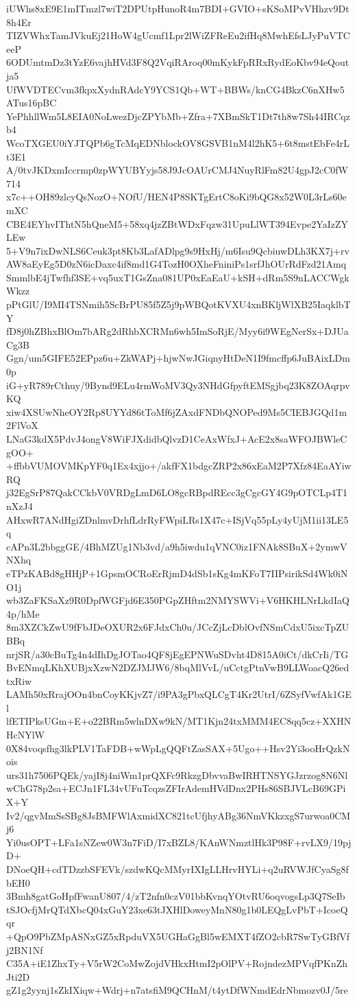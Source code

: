 iUWhs8xE9E1mITmzl7wiT2DPUtpHunoR4m7BDI+GVIO+sKSoMPvVHhzv9Dt8h4Er
TIZVWhxTamJVkuEj21HoW4gUcmf1Lpr2lWiZFReEu2ifHq8MwhEfsLJyPuVTCeeP
6ODUmtmDz3tYzE6vajhHVd3F8Q2VqiRAroq00mKykFpRRxRydEoKbv94eQoutja5
UfWVDTECvm3fkpxXydnRAdcY9YCS1Qb+WT+BBWs/knCG4BkzC6nXHw5ATus16pBC
YePhhllWm5L8EIA0NoLwezDjcZPYbMb+Zfra+7XBmSkT1Dt7th8w7Sh44IRCqzb4
WcoTXGEU0iYJTQPb6gTcMqEDNblockOV8GSVB1nM4l2hK5+6t8mstEbFe4rLt3E1
A/0tvJKDxmIccrmp0zpWYUBYyjs58J9JcOAUrCMJ4NuyRlFm82U4gpJ2cC0fW714
x7c++OH89zlcyQsNozO+NOfU/HEN4P8SKTgErtC8oKi9bQG8x52W0L3rLs60emXC
CBE4EYhvIThtN5hQneM5+58xq4jzZBtWDxFqzw31UpuLlWT394Evpe2YaIzZYLEw
5+V9n7ixDwNLS6Ceuk3pt8Kb3LafADlpg9s9HxHj/m6Isu9QcbiuwDLh3KX7j+rv
AW8aEyEg5D0zN6icDaxc4if8md1G4TozH0OXheFniniPs1srfJhOUrRdFzd21Amq
SmmlbE4jTwfhf3SE+vq5uxT1GsZna081UP0xEaEaU+kSH+dRm5S9nLACCWgkWkzz
pPtGlU/I9MI4TSNmih5ScBrPU85f5Z5j9pWBQotKVXU4xnBKljWlXB25IaqklbTY
fD8j0hZBhxBlOm7bARg2dRhbXCRMn6wh5ImSoRjE/Myy6i9WEgNerSx+DJUaCg3B
Ggn/um5GIFE52EPpz6u+ZkWAPj+hjwNwJGiqnyHtDeN1I9fmcffp6JuBAixLDm0p
iG+yR789rCthuy/9Bynd9ELu4rmWoMV3Qy3NHdGfpyftEMSgjbq23K8ZOAqrpvKQ
xiw4XSUwNheOY2Rp8UYYd86tToMf6jZAxdFNDbQNOPed9Ms5CIEBJGQd1m2FlVoX
LNaG3kdX5PdvJ4ongV8WiFJXdidbQlvzD1CeAxWfxJ+AcE2x8saWFOJBWleCgOO+
+ffbbVUMOVMKpYF0q1Ex4xjjo+/akfFX1bdgcZRP2x86xEaM2P7Xfz84EaAYiwRQ
j32EgSrP87QakCCkbV0VRDgLmD6LO8gcRBpdREcc3gCgcGY4G9pOTCLp4T1nXzJ4
AHxwR7ANdHgiZDnlmvDrhfLdrRyFWpiLRs1X47c+ISjVq55pLy4yUjM1ii13LE5q
cAPn3L2bbggGE/4BhMZUg1Nb3vd/a9h5iwdu1qVNC0iz1FNAk8SBuX+2ymwVNXhq
eTPzKABd8gHHjP+1GpsmOCRoErRjmD4dSb1sKg4mKFoT7IIPsirikSd4Wk0iNO1j
wb3ZaFKSaXz9R0DpfWGFjd6E350PGpZHftm2NMYSWVi+V6HKHLNrLkdIaQ4p/hMe
8m3XZCkZwU9fFbJDeOXUR2x6FJdxCh0u/JCcZjLcDblOvfNSmCdxU5ixcTpZUBBq
nrjSR/a30cBuTg4n4dIhDgJOTao4QF8jEgEPNWuSDvht4D815A0iCt/dkCrIi/TG
BvENmqLKhXUBjxXzwN2DZJMJW6/8bqMlVvL/uCctgPtnVwB9LLWoacQ26edtxRiw
LAMh50xRrajOOn4bnCoyKKjvZ7/i9PA3gPbxQLCgT4Kr2UtrI/6ZSyfVwfAk1GEl
lfETIPksUGm+E+o22BRm5wlnDXw9kN/MT1Kjn24txMMM4EC8qq5cz+XXHNHcNYlW
0X84voqsfhg3lkPLV1TaFDB+wWpLgQQFtZasSAX+5Ugo++Hsv2Yi3ooHrQzkNois
urs31h7506PQEk/yajI8j4niWm1prQXFc9RkzgDbvvaBwIRHTNSYGJzrzog8N6Nl
wChG78p2sa+ECJn1FL34vUFuTcqzsZFIrAdemHVdDnx2PHs86SBJVLcB69GPiX+Y
Iv2/qgvMmSsSBg8JsBMFWlAxmidXC821tcUfjhyABg36NmVKkzxgS7urwoa0CMj6
Yi0usOPT+LFa1sNZew0W3n7FiD/I7xBZL8/KAnWNmztlHk3P98F+rvLX9/19pjD+
DNoeQH+cdTDzzbSFEVk/szdwKQcMMyrIXIgLLHrvHYLi+q2uRVWJfCyaSg8fbEH0
3Bmh8gatGoHpfFwanU807/4/zT2nfn0czV01bbKvnqYOtvRU6oqvogsLp3Q7SeIb
tSJOcfjMrQTdXbcQ04xGuY23xe63tJXHlDoweyMnN80g1b0LEQgLvPbT+IcoeQqr
+QpO9PbZMpASNxGZ5xRpduVX5UGHaGgBl5wEMXT4fZO2cbR7SwTyGBfVfj2BN1Nf
C35A+iE1ZhxTy+V5rW2CoMwZojdVHkxHtmI2pOlPV+RojndezMPVqfPKnZhJti2D
gZ1g2yynj1sZkIXiqw+Wdrj+n7atsfiM9QCHnM/t4ytDfWNmdEdrNbmozv0J/5re
